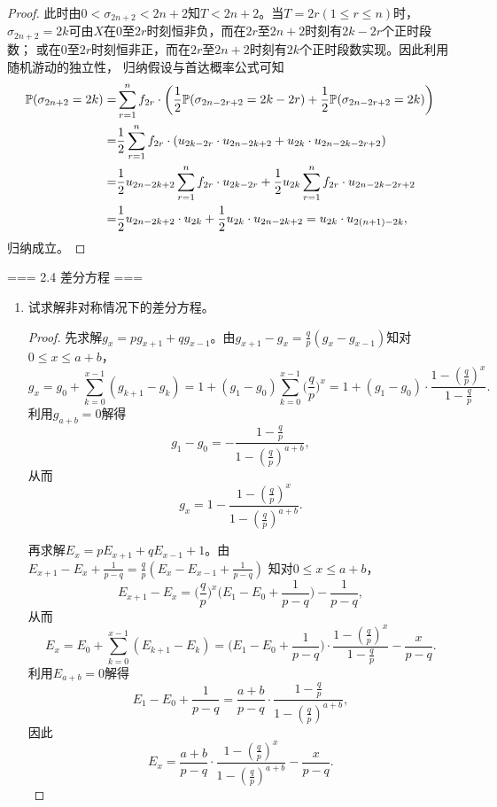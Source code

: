 \begin{enumerate}
\begin{proof}
        此时由$0<\sigma_{2n+2}<2n+2$知$T<2n+2$。当$T=2r(1\leqslant r\leqslant n)$时，
        $\sigma_{2n+2}=2k$可由$X$在$0$至$2r$时刻恒非负，而在$2r$至$2n+2$时刻有$2k-2r$个正时段数；
        或在$0$至$2r$时刻恒非正，而在$2r$至$2n+2$时刻有$2k$个正时段数实现。因此利用随机游动的独立性，
        归纳假设与首达概率公式可知
        \begin{align*}
            \P(\sigma_{2n+2}=2k)=&\sum_{r=1}^n f_{2r}\cdot\bigg(\frac{1}{2}\P(\sigma_{2n-2r+2}=2k-2r)+\frac{1}{2}\P(\sigma_{2n-2r+2}=2k)\bigg)\\
            =&\frac{1}{2}\sum_{r=1}^n f_{2r}\cdot(u_{2k-2r}\cdot u_{2n-2k+2}+u_{2k}\cdot u_{2n-2k-2r+2})\\
            =&\frac{1}{2}u_{2n-2k+2}\sum_{r=1}^n f_{2r}\cdot u_{2k-2r}+\frac{1}{2}u_{2k}\sum_{r=1}^n f_{2r}\cdot u_{2n-2k-2r+2}\\
            =&\frac{1}{2}u_{2n-2k+2}\cdot u_{2k}+\frac{1}{2}u_{2k}\cdot u_{2n-2k+2}=u_{2k}\cdot u_{2(n+1)-2k},
        \end{align*}
        归纳成立。
    \end{proof}
\end{enumerate}

=== 2.4 差分方程 ===
\begin{enumerate}
    \item[2.4.1] 试求解非对称情况下的差分方程。
    \begin{proof}
        先求解$g_x=pg_{x+1}+qg_{x-1}$。由$g_{x+1}-g_x=\frac{q}{p}(g_x-g_{x-1})$知对$0\leqslant x\leqslant a+b$，
        \[g_x=g_0+\sum_{k=0}^{x-1}(g_{k+1}-g_k)=1+(g_1-g_0)\sum_{k=0}^{x-1}\bigg(\frac{q}{p}\bigg)^x=1+(g_1-g_0)\cdot\frac{1-(\frac{q}{p})^x}{1-\frac{q}{p}}.\]
        利用$g_{a+b}=0$解得\[g_1-g_0=-\frac{1-\frac{q}{p}}{1-(\frac{q}{p})^{a+b}},\]
        从而\[g_x=1-\frac{1-(\frac{q}{p})^x}{1-(\frac{q}{p})^{a+b}}.\]

        再求解$E_x=pE_{x+1}+qE_{x-1}+1$。由$E_{x+1}-E_x+\frac{1}{p-q}=\frac{q}{p}(E_x-E_{x-1}+\frac{1}{p-q})$
        知对$0\leqslant x\leqslant a+b$，\[E_{x+1}-E_x=\bigg(\frac{q}{p}\bigg)^x\bigg(E_1-E_0+\frac{1}{p-q}\bigg)-\frac{1}{p-q},\]
        从而\[E_x=E_0+\sum_{k=0}^{x-1}(E_{k+1}-E_k)=\bigg(E_1-E_0+\frac{1}{p-q}\bigg)\cdot\frac{1-(\frac{q}{p})^x}{1-\frac{q}{p}}-\frac{x}{p-q}.\]
        利用$E_{a+b}=0$解得\[E_1-E_0+\frac{1}{p-q}=\frac{a+b}{p-q}\cdot\frac{1-\frac{q}{p}}{1-(\frac{q}{p})^{a+b}},\]
        因此\[E_x=\frac{a+b}{p-q}\cdot\frac{1-(\frac{q}{p})^x}{1-(\frac{q}{p})^{a+b}}-\frac{x}{p-q}.\]
    \end{proof}
\end{enumerate}

